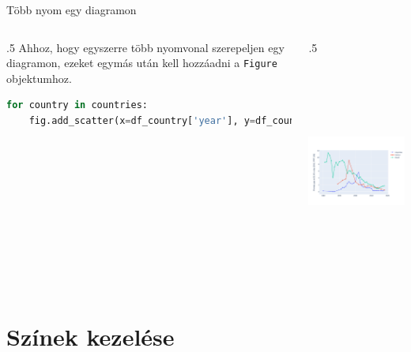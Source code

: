 \documentclass[english, aspectratio=169]{beamer}
\makeatletter
\let\origtableofcontents=\tableofcontents
\def\tableofcontents{\@ifnextchar[{\origtableofcontents}{\gobbletableofcontents}}
\def\gobbletableofcontents#1{\origtableofcontents}
\makeatother
\begin{document}
	\begin{frame}[fragile]{Több nyom egy diagramon}
		\begin{columns}
			\begin{column}{.5\textwidth}
				Ahhoz, hogy egyszerre több nyomvonal szerepeljen egy diagramon, ezeket egymás után kell hozzáadni a \texttt{Figure} objektumhoz.\par\medskip
				\begin{lstlisting}[language=python]
for country in countries:
	fig.add_scatter(x=df_country['year'], y=df_country[perc_pov_19], name=country, mode='markers+lines')
				\end{lstlisting}
			\end{column}
			\begin{column}{.5\textwidth}
				\begin{center}
					\includegraphics[width=7cm, height=7cm, keepaspectratio]{images/scatter_8.png}
				\end{center}
			\end{column}
		\end{columns}
	\end{frame}
	
	\section{Színek kezelése}
	
	\begin{frame}{}
		\tableofcontents[currentsection]
	\end{frame}
	
\end{document}
